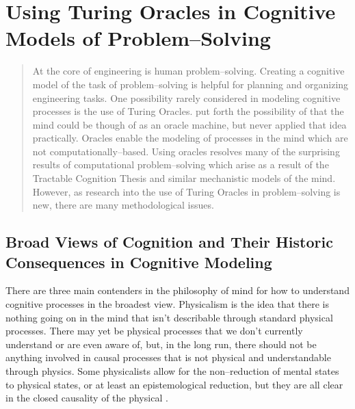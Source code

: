 \chapter[Using Turing Oracles]{Using Turing Oracles in Cognitive Models of Problem--Solving}

\begin{abstract}
At the core of engineering is human problem--solving.  Creating a cognitive model of the task of problem--solving is helpful for planning and organizing engineering tasks.  One possibility rarely considered in modeling cognitive processes is the use of Turing Oracles.  \citet{copeland1998} put forth the possibility of that the mind could be though of as an oracle machine, but never applied that idea practically.  Oracles enable the modeling of processes in the mind which are not computationally--based.  Using oracles resolves many of the surprising results of computational problem--solving which arise as a result of the Tractable Cognition Thesis and similar mechanistic models of the mind.  However, as research into the use of Turing Oracles in problem--solving is new, there are many methodological issues.
\end{abstract}

\section{Broad Views of Cognition and Their Historic Consequences in Cognitive Modeling}

There are three main contenders in the philosophy of mind for how to understand cognitive processes in the broadest view.  Physicalism is the idea that there is nothing going on in the mind that isn't describable through standard physical processes.  There may yet be physical processes that we don't currently understand or are even aware of, but, in the long run, there should not be anything involved in causal processes that is not physical and understandable through physics.  Some physicalists allow for the non--reduction of mental states to physical states, or at least an epistemological reduction, but they are all clear in the closed causality of the physical \citep{horgan1994}.

